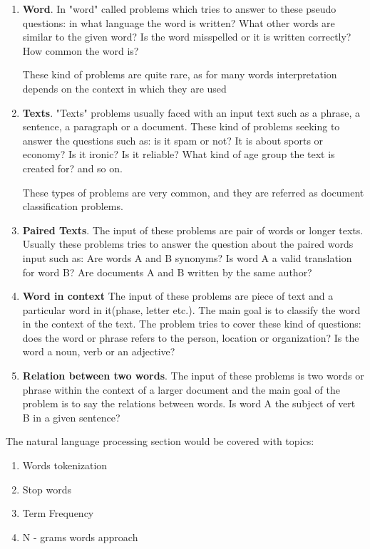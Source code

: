 \begin{enumerate}
    \item \textbf{Word}. In "word" called problems which tries to answer to these pseudo questions: in what language the word is written? What other words are similar to the given word? Is the word misspelled or it is written correctly? How common the word is? 
    
    These kind of problems are quite rare, as for many words interpretation depends on the context in which they are used
    \item \textbf{Texts}. "Texts" problems usually faced with an input text such as a phrase, a sentence, a paragraph or a document. These kind of problems seeking to answer the questions such as: is it spam or not? It is about sports or economy? Is it ironic? Is it reliable? What kind of age group the text is created for? and so on. 
    
    These types of problems are very common, and they are referred as document classification problems.
    \item \textbf{Paired Texts}. The input of these problems are pair of words or longer texts. Usually these problems tries to answer the question about the paired words input such as: Are words A and B synonyms? Is word A a valid translation for word B? Are documents A and B written by the same author?
    \item \textbf{Word in context} The input of these problems are piece of text and a particular word in it(phase, letter etc.). The main goal is to classify the word in the context of the text. The problem tries to cover these kind of questions: does the word or phrase refers to the person, location or organization? Is the word a noun, verb or an adjective? 
    \item \textbf{Relation between two words}. The input of these problems is two words or phrase within the context of a larger document and the main goal of the problem is to say the relations between words. Is word A the subject of vert B in a given sentence?  
\end{enumerate}

The natural language processing section would be covered with topics:

\begin{enumerate}
    \item Words tokenization
    \item Stop words
    \item Term Frequency
    \item N - grams words approach
\end{enumerate}

